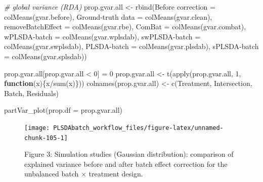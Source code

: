 \documentclass[
]{book}
\newenvironment{Shaded}{\begin{snugshade}}{\end{snugshade}}
\newcommand{\AttributeTok}[1]{\textcolor[rgb]{0.77,0.63,0.00}{#1}}
\newcommand{\CommentTok}[1]{\textcolor[rgb]{0.56,0.35,0.01}{\textit{#1}}}
\newcommand{\ControlFlowTok}[1]{\textcolor[rgb]{0.13,0.29,0.53}{\textbf{#1}}}
\newcommand{\DecValTok}[1]{\textcolor[rgb]{0.00,0.00,0.81}{#1}}
\newcommand{\FunctionTok}[1]{\textcolor[rgb]{0.00,0.00,0.00}{#1}}
\newcommand{\NormalTok}[1]{#1}
\newcommand{\OtherTok}[1]{\textcolor[rgb]{0.56,0.35,0.01}{#1}}
\newcommand{\SpecialCharTok}[1]{\textcolor[rgb]{0.00,0.00,0.00}{#1}}
\newcommand{\StringTok}[1]{\textcolor[rgb]{0.31,0.60,0.02}{#1}}
\begin{document}
\begin{Shaded}
\begin{Highlighting}[]
\CommentTok{\# global variance (RDA)}
\NormalTok{prop.gvar.all }\OtherTok{\textless{}{-}} \FunctionTok{rbind}\NormalTok{(}\StringTok{\textasciigrave{}}\AttributeTok{Before correction}\StringTok{\textasciigrave{}} \OtherTok{=} \FunctionTok{colMeans}\NormalTok{(gvar.before),}
                       \StringTok{\textasciigrave{}}\AttributeTok{Ground{-}truth data}\StringTok{\textasciigrave{}} \OtherTok{=} \FunctionTok{colMeans}\NormalTok{(gvar.clean),}
                       \AttributeTok{removeBatchEffect =} \FunctionTok{colMeans}\NormalTok{(gvar.rbe),}
                       \AttributeTok{ComBat =} \FunctionTok{colMeans}\NormalTok{(gvar.combat),}
                       \StringTok{\textasciigrave{}}\AttributeTok{wPLSDA{-}batch}\StringTok{\textasciigrave{}} \OtherTok{=} \FunctionTok{colMeans}\NormalTok{(gvar.wplsdab),}
                       \StringTok{\textasciigrave{}}\AttributeTok{swPLSDA{-}batch}\StringTok{\textasciigrave{}} \OtherTok{=} \FunctionTok{colMeans}\NormalTok{(gvar.swplsdab),}
                       \StringTok{\textasciigrave{}}\AttributeTok{PLSDA{-}batch}\StringTok{\textasciigrave{}} \OtherTok{=} \FunctionTok{colMeans}\NormalTok{(gvar.plsdab),}
                       \StringTok{\textasciigrave{}}\AttributeTok{sPLSDA{-}batch}\StringTok{\textasciigrave{}} \OtherTok{=} \FunctionTok{colMeans}\NormalTok{(gvar.splsdab))}

\NormalTok{prop.gvar.all[prop.gvar.all }\SpecialCharTok{\textless{}} \DecValTok{0}\NormalTok{] }\OtherTok{=} \DecValTok{0}
\NormalTok{prop.gvar.all }\OtherTok{\textless{}{-}} \FunctionTok{t}\NormalTok{(}\FunctionTok{apply}\NormalTok{(prop.gvar.all, }\DecValTok{1}\NormalTok{, }\ControlFlowTok{function}\NormalTok{(x)\{x}\SpecialCharTok{/}\FunctionTok{sum}\NormalTok{(x)\}))}
\FunctionTok{colnames}\NormalTok{(prop.gvar.all) }\OtherTok{\textless{}{-}} \FunctionTok{c}\NormalTok{(}\StringTok{\textquotesingle{}Treatment\textquotesingle{}}\NormalTok{, }\StringTok{\textquotesingle{}Intersection\textquotesingle{}}\NormalTok{, }\StringTok{\textquotesingle{}Batch\textquotesingle{}}\NormalTok{, }\StringTok{\textquotesingle{}Residuals\textquotesingle{}}\NormalTok{)}

\FunctionTok{partVar\_plot}\NormalTok{(}\AttributeTok{prop.df =}\NormalTok{ prop.gvar.all)}
\end{Highlighting}
\end{Shaded}

\begin{figure}

{\centering \texttt{[image: PLSDAbatch\_workflow\_files/figure-latex/unnamed-chunk-105-1]} 

}

\caption{Figure 3: Simulation studies (Gaussian distribution): comparison of explained variance before and after batch effect correction for the unbalanced batch × treatment design.}\label{fig:unnamed-chunk-105}
\end{figure}
\end{document}

